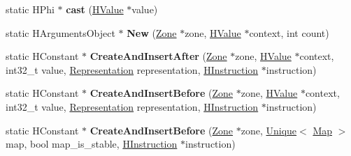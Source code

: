 \begin{DoxyCompactItemize}
\item 
\hypertarget{classv8_1_1internal_1_1_v8___f_i_n_a_l_a31e907ac275b4d398f2a5cddc74cdb48}{}static H\+Phi $\ast$ {\bfseries cast} (\hyperlink{classv8_1_1internal_1_1_h_value}{H\+Value} $\ast$value)\label{classv8_1_1internal_1_1_v8___f_i_n_a_l_a31e907ac275b4d398f2a5cddc74cdb48}

\item 
\hypertarget{classv8_1_1internal_1_1_v8___f_i_n_a_l_a375097f17c2321140221ee4daf3d411f}{}static H\+Arguments\+Object $\ast$ {\bfseries New} (\hyperlink{classv8_1_1internal_1_1_zone}{Zone} $\ast$zone, \hyperlink{classv8_1_1internal_1_1_h_value}{H\+Value} $\ast$context, int count)\label{classv8_1_1internal_1_1_v8___f_i_n_a_l_a375097f17c2321140221ee4daf3d411f}

\item 
\hypertarget{classv8_1_1internal_1_1_v8___f_i_n_a_l_a7bda0dc6b080512033eb5bde846b36ee}{}static H\+Constant $\ast$ {\bfseries Create\+And\+Insert\+After} (\hyperlink{classv8_1_1internal_1_1_zone}{Zone} $\ast$zone, \hyperlink{classv8_1_1internal_1_1_h_value}{H\+Value} $\ast$context, int32\+\_\+t value, \hyperlink{classv8_1_1internal_1_1_representation}{Representation} representation, \hyperlink{classv8_1_1internal_1_1_h_instruction}{H\+Instruction} $\ast$instruction)\label{classv8_1_1internal_1_1_v8___f_i_n_a_l_a7bda0dc6b080512033eb5bde846b36ee}

\item 
\hypertarget{classv8_1_1internal_1_1_v8___f_i_n_a_l_a6d8e24d22ff3cdb5ecb528c404653cfe}{}static H\+Constant $\ast$ {\bfseries Create\+And\+Insert\+Before} (\hyperlink{classv8_1_1internal_1_1_zone}{Zone} $\ast$zone, \hyperlink{classv8_1_1internal_1_1_h_value}{H\+Value} $\ast$context, int32\+\_\+t value, \hyperlink{classv8_1_1internal_1_1_representation}{Representation} representation, \hyperlink{classv8_1_1internal_1_1_h_instruction}{H\+Instruction} $\ast$instruction)\label{classv8_1_1internal_1_1_v8___f_i_n_a_l_a6d8e24d22ff3cdb5ecb528c404653cfe}

\item 
\hypertarget{classv8_1_1internal_1_1_v8___f_i_n_a_l_a3bb60b01cd45f89cec84dddb9875f0fe}{}static H\+Constant $\ast$ {\bfseries Create\+And\+Insert\+Before} (\hyperlink{classv8_1_1internal_1_1_zone}{Zone} $\ast$zone, \hyperlink{classv8_1_1internal_1_1_unique}{Unique}$<$ \hyperlink{classv8_1_1internal_1_1_map}{Map} $>$ map, bool map\+\_\+is\+\_\+stable, \hyperlink{classv8_1_1internal_1_1_h_instruction}{H\+Instruction} $\ast$instruction)\label{classv8_1_1internal_1_1_v8___f_i_n_a_l_a3bb60b01cd45f89cec84dddb9875f0fe}


\end{DoxyCompactItemize}
